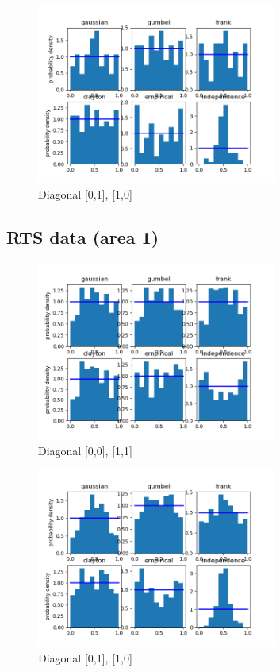 \begin{figure}[h]
	\centering
	\includegraphics[width=0.7\textwidth]{RTS/2020-10-09_12_00-2020-10-09_13_00-1.png}
	\caption{Diagonal [0,1], [1,0]}
\end{figure}

\clearpage

\subsection{RTS data (area 1)}



\begin{figure}[h]
	\centering
	\includegraphics[width=0.7\textwidth]{RTS/Area_1/2020-02-03_08_00-2020-02-03_09_00-0.png}
	\caption{Diagonal [0,0], [1,1]}
\end{figure}

\begin{figure}[h]
	\centering
	\includegraphics[width=0.7\textwidth]{RTS/Area_1/2020-02-03_08_00-2020-02-03_09_00-1.png}
	\caption{Diagonal [0,1], [1,0]}
\end{figure}

